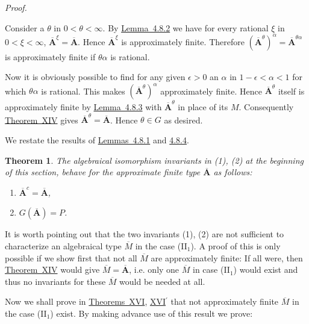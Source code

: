 \documentclass[b5paper,twoside]{article}
\newcommand{\thmref}[2]{\hyperref[#1]{\mbox{Theorem~#2}}}
\newcommand{\lemref}[2]{\hyperref[#1]{\mbox{Lemma~#2}}}
\theoremstyle{mvnplain}
\newtheorem{theorem}{Theorem}
\renewenvironment{proof}[1][Proof]{%
  \par\addvspace{0.35\baselineskip}%
  \noindent\textit{#1.}\ \normalfont\ignorespaces
}{%
  \par\addvspace{0.35\baselineskip}%
}
\newcommand{\M}{\mathbf M}
\def\M{M}%
\def\mathfrak#1{#1}%
\begin{document}
\begin{proof}
Consider a \(\theta\) in \(0<\theta<\infty\). By
\lemref{lem:4.8.2}{4.8.2} we have for every rational \(\xi\) in
\(0<\xi<\infty\),
\(\overline{\mathbf A}^{\xi}=\overline{\mathbf A}\). Hence
\(\overline{\mathbf A}^{\xi}\) is approximately finite. Therefore
\((\overline{\mathbf A}^{\theta})^\alpha
=\overline{\mathbf A}^{\theta\alpha}\) is approximately finite if
\(\theta\alpha\) is rational.

Now it is obviously possible to find for any given \(\epsilon>0\) an
\(\alpha\) in \(1-\epsilon<\alpha<1\) for which \(\theta\alpha\) is rational.
This makes \((\overline{\mathbf A}^{\theta})^\alpha\) approximately finite.
Hence \(\overline{\mathbf A}^{\theta}\) itself is approximately finite by
\lemref{lem:4.8.3}{4.8.3} with \(\overline{\mathbf A}^{\theta}\) in place of
its \(\M\). Consequently \thmref{thm:XIV}{XIV} gives
\(\overline{\mathbf A}^{\theta}=\overline{\mathbf A}\). Hence
\(\theta\in\mathfrak G\) as desired.
\end{proof}

We restate the results of \hyperref[lem:4.8.1]{\mbox{Lemmas 4.8.1}} and
\hyperref[lem:4.8.4]{\mbox{4.8.4}}.

\begin{theorem}\label{thm:XV}
The algebraical isomorphism invariants in (1), (2) at the beginning of this
section, behave for the approximate finite type \(\overline{\mathbf A}\) as
follows:
\begin{enumerate}[label=(\arabic*)]
\item \(\overline{\mathbf A}^{c}=\overline{\mathbf A}\),
\item \(\mathfrak G(\overline{\mathbf A})=P\).
\end{enumerate}
\end{theorem}

It is worth pointing out that the two invariants (1), (2) are not sufficient to
characterize an algebraical type \(\overline{\M}\) in the case (II\(_1\)). A
proof of this is only possible if we show first that not all \(\overline{\M}\)
are approximately finite: If all were, then \thmref{thm:XIV}{XIV} would give
\(\overline{\M}=\overline{\mathbf A}\), i.e. only one \(\overline{\M}\) in
case (II\(_1\)) would exist and thus no invariants for these
\(\overline{\M}\) would be needed at all.

Now we shall prove in \hyperref[thm:XVI]{\mbox{Theorems XVI}},
\hyperref[thm:XVI-prime]{\mbox{XVI\(^{\prime}\)}} that not approximately finite
\(\overline{\M}\) in the case (II\(_1\)) exist. By making advance use of
this result we prove:
\end{document}
